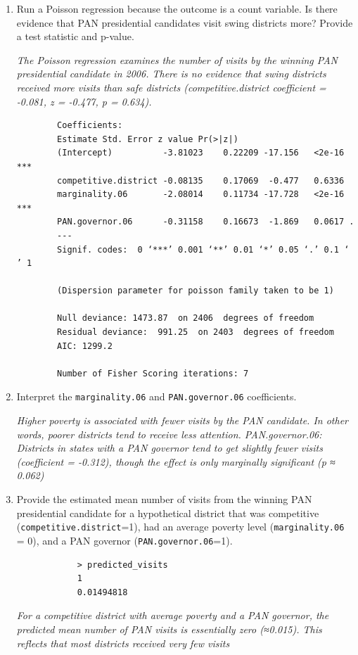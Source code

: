 \documentclass[12pt,letterpaper]{article}
\begin{document}
	\begin{enumerate}
		\item [(a)] Run a Poisson regression because the outcome is a count variable. Is there evidence that PAN presidential candidates visit swing districts more? Provide a test statistic and p-value.
		
		\textit{ The Poisson regression examines the number of visits by the winning PAN presidential candidate in 2006. 
			There is no evidence that swing districts received more visits than safe districts (competitive.district coefficient = -0.081, z = -0.477, p = 0.634). }
		
		
		
					\begin{verbatim}
		Coefficients:
		Estimate Std. Error z value Pr(>|z|)    
		(Intercept)          -3.81023    0.22209 -17.156   <2e-16 ***
		competitive.district -0.08135    0.17069  -0.477   0.6336    
		marginality.06       -2.08014    0.11734 -17.728   <2e-16 ***
		PAN.governor.06      -0.31158    0.16673  -1.869   0.0617 .  
		---
		Signif. codes:  0 ‘***’ 0.001 ‘**’ 0.01 ‘*’ 0.05 ‘.’ 0.1 ‘ ’ 1
		
		(Dispersion parameter for poisson family taken to be 1)
		
		Null deviance: 1473.87  on 2406  degrees of freedom
		Residual deviance:  991.25  on 2403  degrees of freedom
		AIC: 1299.2
		
		Number of Fisher Scoring iterations: 7 
		\end{verbatim}
		
		\item [(b)] Interpret the \texttt{marginality.06} and \texttt{PAN.governor.06} coefficients.
		
		\textit{ Higher poverty is associated with fewer visits by the PAN candidate. In other words, poorer districts tend to receive less attention. PAN.governor.06: Districts in states with a PAN governor tend to get slightly fewer visits (coefficient = -0.312), though the effect is only marginally significant (p ≈ 0.062)}
		
		\item [(c)] Provide the estimated mean number of visits from the winning PAN presidential candidate for a hypothetical district that was competitive (\texttt{competitive.district}=1), had an average poverty level (\texttt{marginality.06} = 0), and a PAN governor (\texttt{PAN.governor.06}=1).
		
		
		
					\begin{verbatim}
			> predicted_visits
			1 
			0.01494818 
		\end{verbatim}
		
		\textit{For a competitive district with average poverty and a PAN governor, the predicted mean number of PAN visits is essentially zero (≈0.015). This reflects that most districts received very few visits}
	\end{enumerate}
	
\end{document}
